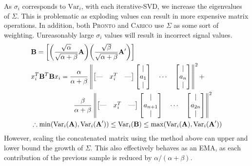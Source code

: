 As $\sigma_i$ corresponds to $\text{Var}_i$, with each iterative-SVD, we
increase the eigenvalues of $\Sigma$. This is problematic as exploding values
can result in more expensive matrix operations. In addition, both \textsc{Pronto} and
\textsc{Carico} use $\Sigma$ as some sort of weighting. Unreasonably large $\sigma_i$
values will result in incorrect signal values.
\begin{align}
    & \textbf{B} = \left[\bigg(\frac{\sqrt{\alpha}}{\sqrt{\alpha +
    \beta}}\mathbf{A}\bigg)\bigg(\frac{\sqrt{\beta}}{\sqrt{\alpha +
    \beta}}\mathbf{A'}\bigg)\right] \\
& x_i^T \mathbf{B}^T\mathbf{B} x_i = \frac{\alpha}{\alpha + \beta}\left\| \begin{bmatrix}
\text{---} & x_i^T & \text{---} \\
\end{bmatrix}
\begin{bmatrix}
| \\
a_1 \\
|
\end{bmatrix} \quad \cdots \quad
\begin{bmatrix}
| \\
a_{n} \\
|
\end{bmatrix} \right\|^2 + \\
& \hspace{2.2cm} \frac{\beta}{\alpha + \beta}\left\| \begin{bmatrix}
\text{---} & x_i^T & \text{---} \\
\end{bmatrix}
\begin{bmatrix}
| \\
a_{n+1} \\
|
\end{bmatrix} \quad \cdots \quad
\begin{bmatrix}
| \\
a_{2n} \\
|
\end{bmatrix} \right\|^2\\
    &\therefore \min(\text{Var}_i(\textbf{A}), \text{Var}_i(\textbf{A}')) \leq
    \text{Var}_i(\textbf{B}) \leq \max(\text{Var}_i(\textbf{A}),
    \text{Var}_i(\textbf{A}'))
\end{align}
However, scaling the concatenated matrix using the method above can upper
and lower bound the growth of $\Sigma$. This also effectively behaves as an EMA,
as each contribution of the previous sample is reduced by $\alpha / (\alpha +
\beta)$.

